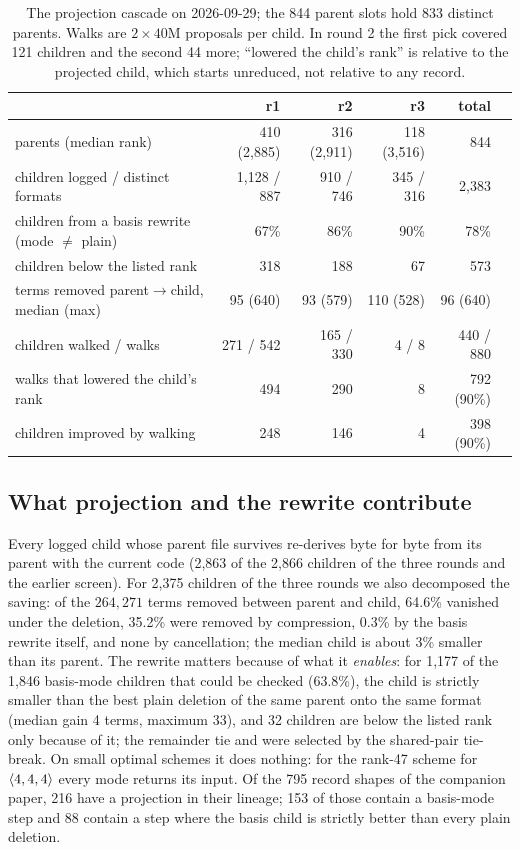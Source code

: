\begin{table}[t]
\centering\small
\begin{tabular}{@{}lrrrrr@{}}
\toprule
& r1 & r2 & r3 & total\\
\midrule
parents (median rank) & 410 (2{,}885) & 316 (2{,}911) & 118 (3{,}516) & 844\\
children logged / distinct formats & 1{,}128 / 887 & 910 / 746 & 345 / 316 & 2{,}383\\
children from a basis rewrite (mode $\ne$ plain) & 67\% & 86\% & 90\% & 78\%\\
children below the listed rank & 318 & 188 & 67 & 573\\
terms removed parent$\to$child, median (max) & 95 (640) & 93 (579) & 110 (528) & 96 (640)\\
children walked / walks & 271 / 542 & 165 / 330 & 4 / 8 & 440 / 880\\
walks that lowered the child's rank & 494 & 290 & 8 & 792 (90\%)\\
children improved by walking & 248 & 146 & 4 & 398 (90\%)\\
\bottomrule
\end{tabular}
\caption{The projection cascade on 2026-09-29; the 844 parent slots hold 833 distinct parents. Walks are $2\times40$M proposals per child. In round 2 the first pick covered 121 children and the second 44 more; ``lowered the child's rank'' is relative to the projected child, which starts unreduced, not relative to any record.}
\label{tab:cascade}
\end{table}

\subsection{What projection and the rewrite contribute}
Every logged child whose parent file survives re-derives byte for byte from its parent with the current code (2{,}863 of the 2{,}866 children of the three rounds and the earlier screen). For 2{,}375 children of the three rounds we also decomposed the saving: of the $264{,}271$ terms removed between parent and child, 64.6\% vanished under the deletion, 35.2\% were removed by compression, 0.3\% by the basis rewrite itself, and none by cancellation; the median child is about 3\% smaller than its parent.
The rewrite matters because of what it \emph{enables}: for 1{,}177 of the 1{,}846 basis-mode children that could be checked (63.8\%), the child is strictly smaller than the best plain deletion of the same parent onto the same format (median gain 4 terms, maximum 33), and 32 children are below the listed rank only because of it; the remainder tie and were selected by the
shared-pair tie-break. On small optimal schemes it does nothing: for the rank-47 scheme for $\langle 4,4,4\rangle$ every mode returns its input.
Of the 795 record shapes of the companion paper, 216 have a projection in their lineage; 153 of those contain a basis-mode step and 88 contain a step where the basis child is strictly better than every plain deletion.

